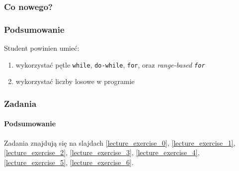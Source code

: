 \documentclass[aspectratio=169]{beamer}
\begin{document}
\begin{frame}
    \frametitle{Co nowego?}
    \frametitle{Podsumowanie}

    Student powinien umieć:

    \begin{enumerate}
        \item wykorzystać pętle {\tt while}, {\tt do-while}, {\tt for}, oraz
            \emph{range-based {\tt for}}
        \item wykorzystać liczby losowe w programie
    \end{enumerate}
\end{frame}

\begin{frame}
    \frametitle{Zadania}
    \framesubtitle{Podsumowanie}

    Zadania znajdują się na slajdach
    \ref{lecture_exercise_0},
    \ref{lecture_exercise_1},
    \ref{lecture_exercise_2},
    \ref{lecture_exercise_3},
    \ref{lecture_exercise_4},
    \ref{lecture_exercise_5},
    \ref{lecture_exercise_6}.
\end{frame}
\end{document}
